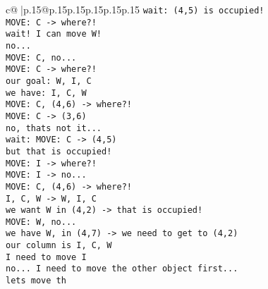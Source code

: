 \documentclass{article}
\begin{document}
{\begin{supertabular}{c@{$\;$}|p{.15\linewidth}@{}p{.15\linewidth}p{.15\linewidth}p{.15\linewidth}p{.15\linewidth}p{.15\linewidth}}
{{{\tt  wait: (4,5) is occupied!\\ \tt  MOVE: C -> where?!\\ \tt  wait! I can move W!\\ \tt  no...\\ \tt  MOVE: C, no...\\ \tt  MOVE: C -> where?!\\ \tt  our goal: W, I, C \\ \tt  we have: I, C, W \\ \tt  MOVE: C, (4,6) -> where?!\\ \tt  MOVE: C -> (3,6) \\ \tt  no, thats not it...\\ \tt  wait: MOVE: C -> (4,5) \\ \tt  but that is occupied!\\ \tt  MOVE: I -> where?!\\ \tt  MOVE: I -> no...\\ \tt  MOVE: C, (4,6) -> where?!\\ \tt  I, C, W -> W, I, C\\ \tt  we want W in (4,2) -> that is occupied!\\ \tt  MOVE: W, no...\\ \tt  we have W, in (4,7) -> we need to get to (4,2) \\ \tt  our column is I, C, W \\ \tt  I need to move I \\ \tt  no... I need to move the other object first...\\ \tt  lets move th}}}
\end{supertabular}}
\end{document}
